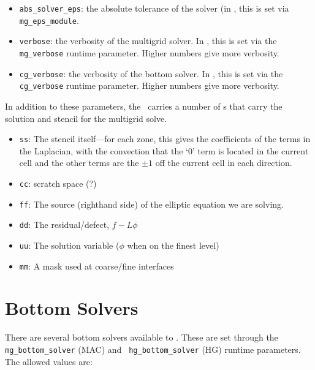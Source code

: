 \begin{itemize}
\item {\tt abs\_solver\_eps}: the absolute tolerance of the solver (in
  \maestro, this is set via {\tt mg\_eps\_module}.

\item {\tt verbose}: the verbosity of the multigrid solver.  In \maestro,
  this is set via the {\tt mg\_verbose} runtime parameter.  Higher
  numbers give more verbosity.

\item {\tt cg\_verbose}: the verbosity of the bottom solver.  In \maestro,
  this is set via the {\tt cg\_verbose} runtime parameter.  Higher
  numbers give more verbosity.

\end{itemize}

In addition to these parameters, the \mgtower\ carries a number of
\multifab s that carry the solution and stencil for the multigrid
solve.

\begin{itemize}

\item {\tt ss}: The stencil itself---for each zone, this gives the 
  coefficients of the terms in the Laplacian, with the convection that
  the `0' term is located in the current cell and the other terms are
  the $\pm 1$ off the current cell in each direction.

\item {\tt cc}: scratch space (?)

\item {\tt ff}: The source (righthand side) of the elliptic equation
  we are solving.

\item {\tt dd}: The residual/defect, $f - L\phi$

\item {\tt uu}: The solution variable ($\phi$ when on the finest level)

\item {\tt mm}: A mask used at coarse/fine interfaces
\end{itemize}

\section{Bottom Solvers}

There are several bottom solvers available to \maestro.  These are set
through the {\tt mg\_bottom\_solver} (MAC) and {\tt
  hg\_bottom\_solver} (HG) runtime parameters.  The allowed values
  are:

